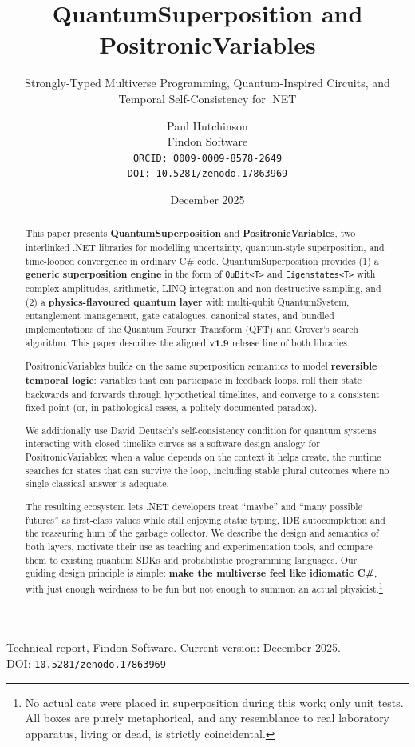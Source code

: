 \documentclass[a4paper,11pt]{article}
\title{QuantumSuperposition and PositronicVariables}
\author{%
Paul Hutchinson\\
Findon Software\\
\texttt{ORCID: 0009-0009-8578-2649}\\
\texttt{DOI: 10.5281/zenodo.17863969}
}
\date{December 2025}
\subtitle{Strongly-Typed Multiverse Programming, Quantum-Inspired Circuits, and Temporal Self-Consistency for .NET}
\begin{document}
\maketitle

\begin{center}
\small
Technical report, Findon Software. Current version: December 2025.\\
DOI: \texttt{10.5281/zenodo.17863969}
\end{center}

\tableofcontents
\bigskip

\begin{abstract}
\sloppy
This paper presents \textbf{QuantumSuperposition} and \textbf{PositronicVariables}, 
two interlinked .NET libraries for modelling uncertainty, quantum-style superposition, 
and time-looped convergence in ordinary C\# code. QuantumSuperposition provides 
(1) a \textbf{generic superposition engine} in the form of \texttt{QuBit<T>} and 
\texttt{Eigenstates<T>} with complex amplitudes, arithmetic, LINQ integration 
and non-destructive sampling, and 
(2) a \textbf{physics-flavoured quantum layer} with multi-qubit QuantumSystem, 
entanglement management, gate catalogues, canonical states, and bundled 
implementations of the Quantum Fourier Transform (QFT) and Grover's search 
algorithm.\parencite{Pau25}
This paper describes the aligned \textbf{v1.9} release line of both libraries.

PositronicVariables builds on the same superposition semantics to model 
\textbf{reversible temporal logic}: variables that can participate in feedback loops, 
roll their state backwards and forwards through hypothetical timelines, and converge 
to a consistent fixed point (or, in pathological cases, a politely documented paradox).

We additionally use David Deutsch's self-consistency condition for quantum
systems interacting with closed timelike curves as a software-design analogy for
PositronicVariables: when a value depends on the context it helps create, the
runtime searches for states that can survive the loop, including stable plural
outcomes where no single classical answer is adequate.\parencite{Deutsch91CTC}

The resulting ecosystem lets .NET developers treat “maybe” and “many possible futures” 
as first-class values while still enjoying static typing, IDE autocompletion and the 
reassuring hum of the garbage collector. We describe the design and semantics of both 
layers, motivate their use as teaching and experimentation tools, and compare them to 
existing quantum SDKs and probabilistic programming languages. Our guiding design 
principle is simple: \textbf{make the multiverse feel like idiomatic C\#}, with just 
enough weirdness to be fun but not enough to summon an actual physicist.\footnote{
No actual cats were placed in superposition during this work; only unit tests. All 
boxes are purely metaphorical, and any resemblance to real laboratory apparatus, 
living or dead, is strictly coincidental.
}
\fussy
\end{abstract}
\end{document}
